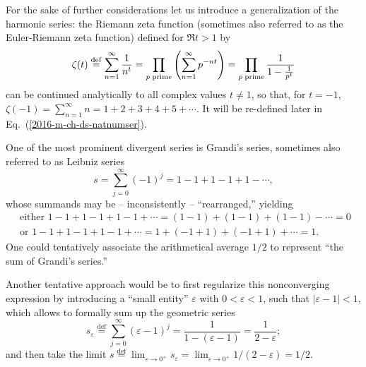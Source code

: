 For the sake of further considerations let us introduce a generalization of the harmonic series:
the Riemann zeta function (sometimes also referred to as the Euler-Riemann zeta function)
defined for $\Re t > 1$ by
\begin{equation}
\zeta (t) \stackrel{{\rm def}}{=}
\sum_{n=1}^\infty \frac{1}{n^t}
=
\prod_{p\;{\rm prime}} \left(\sum_{n=1}^\infty p^{-nt}\right)
=
\prod_{p\;{\rm prime}} \frac{1}{1-\frac{1}{p^t}}
\label{2016-m-ds-zeta}
\end{equation}
can be  continued analytically to all complex values $t\neq 1$, so that, for $t=-1$,
$\zeta (-1) = \sum_{n=1}^\infty n = 1+2+3+4+5 + \cdots $.
It will be re-defined later in Eq.~(\ref{2016-m-ch-ds-natnumser}).


One of the most prominent divergent series is Grandi's series, sometimes also referred to as
Leibniz series~\cite{leibnitz-1860,moore-1938,Hardy:1949,everest-2003}
\begin{equation}
s = \sum_{j=0}^\infty (-1)^j=1-1+1-1+1-\cdots ,
\label{2009-fiftyfifty-1s}
\end{equation}
whose summands may be -- inconsistently
-- ``rearranged,''
yielding
\begin{equation*}
\begin{split}
\textrm{ either }
1-1+1-1+1-1+\cdots = (1-1)+(1-1)+(1-1)-\cdots =0\\
\textrm{ or }
1-1+1-1+1-1+\cdots = 1+(-1+1)+ (-1+1) +\cdots =1.
\end{split}
\end{equation*}
One could tentatively associate the arithmetical average $1/2$ to represent ``the sum of Grandi's series.''

Another tentative approach  would be to first regularize this nonconverging expression by introducing a ``small entity''
$\varepsilon$ with $0 < \varepsilon <1$, such that $\vert \varepsilon - 1 \vert  <1$, which allows to formally sum up the geometric series
\begin{equation*}
s_\varepsilon \stackrel{\text{def}}{=} \sum_{j=0}^\infty (\varepsilon -1)^j=\frac{1}{1-(\varepsilon -1)}   =\frac{1}{2- \varepsilon  };
\end{equation*}
and then take the limit $s \stackrel{\text{def}}{=}  \lim_{\varepsilon \rightarrow 0^+} s_\varepsilon
= \lim_{\varepsilon \rightarrow 0^+}  1/(2- \varepsilon  ) =   1/2$.

